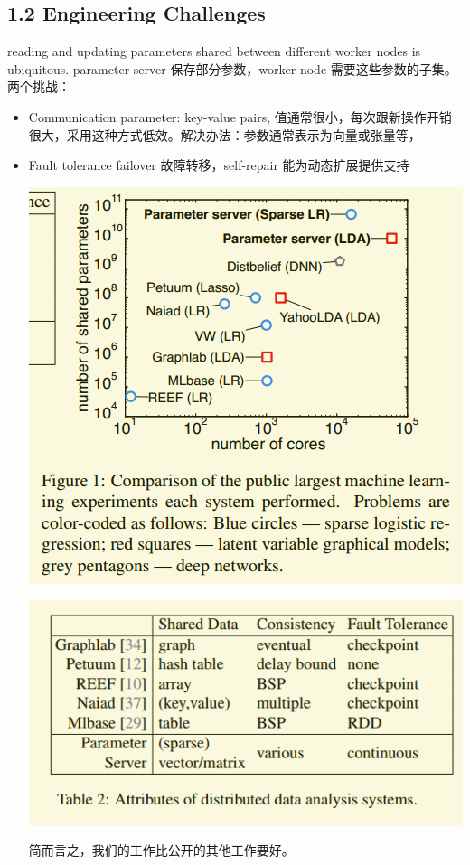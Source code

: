 \documentclass[11pt]{article}
\begin{document}
\subsection{1.2 Engineering Challenges}
\label{sec:orgf81ee8c}
reading and updating parameters shared between different worker nodes is ubiquitous. parameter server 保存部分参数，worker node 需要这些参数的子集。两个挑战：
\begin{itemize}
\item Communication
parameter: key-value pairs, 值通常很小，每次跟新操作开销很大，采用这种方式低效。解决办法：参数通常表示为向量或张量等，
\item Fault tolerance
failover 故障转移，self-repair 能为动态扩展提供支持

\begin{center}
\includegraphics[width=.9\linewidth]{PS.org_imgs/20201109_162042_R64TTN.png}
\end{center} 

\begin{center}
\includegraphics[width=.9\linewidth]{PS.org_imgs/20201109_162533_ZZHIl4.png}
\end{center} 

简而言之，我们的工作比公开的其他工作要好。
\end{itemize}
\end{document}
